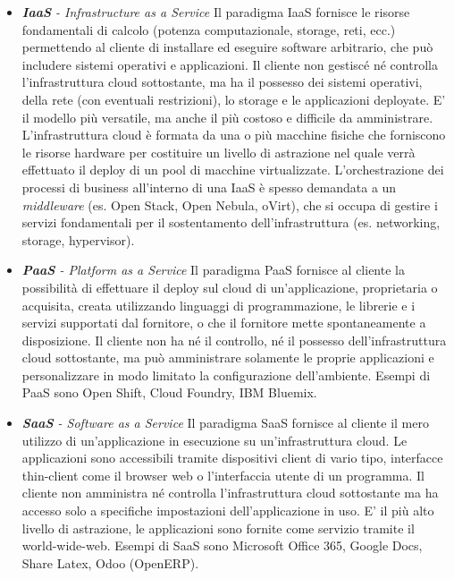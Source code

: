 \begin{itemize}
\item \textit{\textbf{IaaS} - Infrastructure as a Service} Il paradigma IaaS fornisce le risorse fondamentali di calcolo (potenza computazionale, storage, reti, ecc.) permettendo al cliente di installare ed eseguire software arbitrario, che può includere sistemi operativi e applicazioni. Il cliente non gestiscé né controlla l'infrastruttura cloud sottostante, ma ha il possesso dei sistemi operativi, della rete (con eventuali restrizioni), lo storage e le applicazioni deployate.
E' il modello più versatile, ma anche il più costoso e difficile da amministrare.
L'infrastruttura cloud è formata da una o più macchine fisiche che forniscono le risorse hardware per costituire un livello di astrazione nel quale verrà effettuato il deploy di un pool di macchine virtualizzate.
L'orchestrazione dei processi di business all'interno di una IaaS è spesso demandata a un \textit{middleware} (es. Open Stack, Open Nebula, oVirt), che si occupa di gestire i servizi fondamentali per il sostentamento dell'infrastruttura (es. networking, storage, hypervisor).
\item \textit{\textbf{PaaS} - Platform as a Service} Il paradigma PaaS fornisce al cliente la possibilità di effettuare il deploy sul cloud di un'applicazione, proprietaria o acquisita, creata utilizzando linguaggi di programmazione, le librerie e i servizi supportati dal fornitore, o che il fornitore mette spontaneamente a disposizione. Il cliente non ha né il controllo, né il possesso dell'infrastruttura cloud sottostante, ma può amministrare solamente le proprie applicazioni e personalizzare in modo limitato la configurazione dell'ambiente.
Esempi di PaaS sono Open Shift, Cloud Foundry, IBM Bluemix.
\item \textit{\textbf{SaaS} - Software as a Service} Il paradigma SaaS fornisce al cliente il mero utilizzo di un'applicazione in esecuzione su un'infrastruttura cloud. Le applicazioni sono accessibili tramite dispositivi client di vario tipo, interfacce thin-client come il browser web o l'interfaccia utente di un programma.
Il cliente non amministra né controlla l'infrastruttura cloud sottostante ma ha accesso solo a specifiche impostazioni dell'applicazione in uso.\cite{NISTCloud}
E' il più alto livello di astrazione, le applicazioni sono fornite come servizio tramite il world-wide-web. 
Esempi di SaaS sono Microsoft Office 365, Google Docs, Share Latex, Odoo (OpenERP).
\end{itemize}
